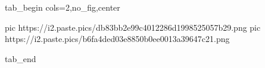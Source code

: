  
 
 
 
 


\ifcmt
  tab_begin cols=2,no_fig,center

     pic https://i2.paste.pics/db83bb2e99c4012286d1998525057b29.png
		 pic https://i2.paste.pics/b6fa4ded03e8850b0ee0013a39647c21.png

  tab_end
\fi
